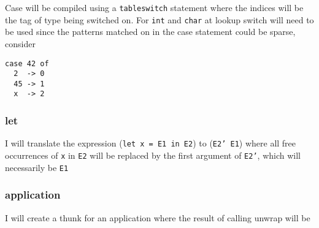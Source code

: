\documentclass[12pt,a4paper,twoside]{article}
\begin{document}
Case will be compiled using a \texttt{tableswitch} statement where the indices will be the tag of type being switched on. For \texttt{int} and \texttt{char} at lookup 
switch will need to be used since the patterns matched on in the case statement could be sparse, consider

\begin{verbatim}
case 42 of
  2  -> 0
  45 -> 1
  x  -> 2
\end{verbatim}

\subsubsection{let} 

I will translate the expression (\texttt{let x = E1 in E2}) to (\texttt{E2' E1}) where all free occurrences of \texttt{x} in \texttt{E2} will be replaced 
by the first argument of \texttt{E2'}, which will necessarily be \texttt{E1}

\subsubsection{application}

I will create a thunk for an application where the result of calling unwrap will be 
\end{document}
